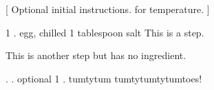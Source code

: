 
[
Optional initial instructions.  for temperature.
]

\begin{step}
1 . egg, chilled
1 tablespoon salt
\method
This is a step.

This is another step but has no ingredient.
\end{step}

\begin{step}
. . optional
1 . tumtytum
\method
tumtytumtytumtoes!
\end{step}

